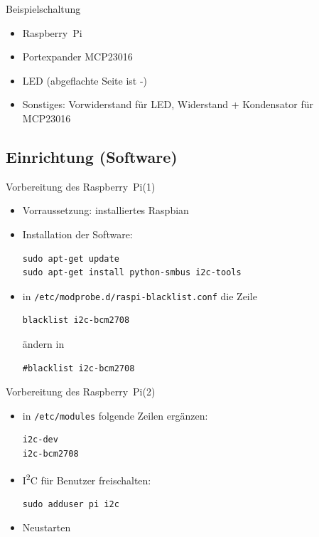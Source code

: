 \documentclass{beamer}
\newcommand{\ItC}{I\textsuperscript{2}C\xspace}
\newcommand{\RPi}{Raspberry~Pi\xspace}
\begin{document}
\begin{frame}{Beispielschaltung}
 \begin{itemize}
   \item \RPi
   \item Portexpander MCP23016
    
  \item LED (abgeflachte Seite ist -)
  \item Sonstiges: Vorwiderstand für LED, Widerstand + Kondensator für MCP23016
 \end{itemize}
\end{frame}



\subsection{Einrichtung (Software)}

\begin{frame}[fragile]{Vorbereitung des \RPi  (1)}
 \begin{itemize}
   \item Vorraussetzung: installiertes Raspbian
   \item Installation der Software:
    \lstset{language=bash}
    \begin{lstlisting}
sudo apt-get update
sudo apt-get install python-smbus i2c-tools
    \end{lstlisting}
  \item in \lstinline|/etc/modprobe.d/raspi-blacklist.conf| die Zeile
    \begin{lstlisting}
blacklist i2c-bcm2708
    \end{lstlisting} ändern in \begin{lstlisting}
#blacklist i2c-bcm2708
    \end{lstlisting}
 \end{itemize}
\end{frame}
 
\begin{frame}[fragile]{Vorbereitung des \RPi  (2)}
 \begin{itemize}
  \item in \lstinline|/etc/modules| folgende Zeilen ergänzen:
    \begin{lstlisting}
i2c-dev
i2c-bcm2708
    \end{lstlisting}
  \item \ItC für Benutzer freischalten:
    \begin{lstlisting}
sudo adduser pi i2c
    \end{lstlisting}
  \item Neustarten
 \end{itemize}
\end{frame}
\end{document}
